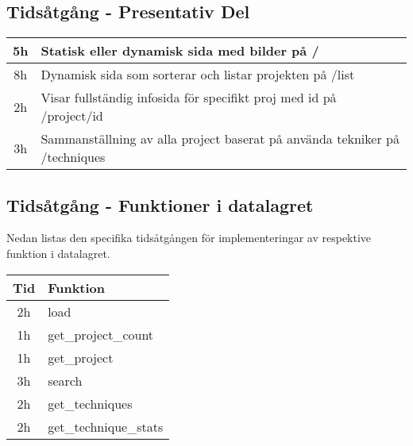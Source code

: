 \documentclass{TDP003mall}
\begin{document}
\subsection{Tidsåtgång - Presentativ Del}
\begin{tabular}{|c|l|}
  \hline
  5h & Statisk eller dynamisk sida med bilder på /\\
  \hline
  8h & Dynamisk sida som sorterar och listar projekten på /list\\
  \hline
  2h & Visar fullständig infosida för specifikt proj med id på /project/id\\
  \hline
  3h & Sammanställning av alla project baserat på använda tekniker på /techniques\\
  \hline
\end{tabular}

\subsection{Tidsåtgång - Funktioner i datalagret}
Nedan listas den specifika tidsåtgången för implementeringar av respektive funktion i datalagret.

\begin{tabular}{|c|l|}
  \hline
  Tid & Funktion\\
  \hline
  2h & load\\
  \hline
  1h & get\_project\_count\\
  \hline
  1h & get\_project\\
  \hline
  3h & search\\
  \hline
  2h & get\_techniques\\
  \hline
  2h & get\_technique\_stats\\
  \hline
\end{tabular}
\end{document}
